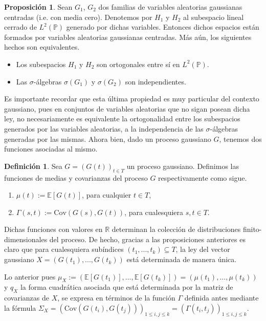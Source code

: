 \documentclass[letterpaper,twoside,12pt]{book}
\newcommand{\R}{\mathbb{R}}
\newcommand{\E}{\mathbb{E}}
\renewcommand{\P}{\mathbb{P}}
\newcommand{\1}{\mathds{1}}
\theoremstyle{definition}
\newtheorem{dfn}{Definición}
\theoremstyle{definition}
\theoremstyle{remark}
\theoremstyle{definition}
\theoremstyle{definition}
\newtheorem{prop}{Proposición}
\theoremstyle{definition}
\theoremstyle{definition}
\theoremstyle{definition}
\begin{document}
\begin{prop}\label{Gaussi_indep} 
 Sean $G_1$, $G_2$ dos familias de variables aleatorias gaussianas centradas (i.e. con media cero). Denotemos por $H_1$ y $H_2$ al subespacio lineal cerrado de $L^{2}(\P)$ generado por dichas variables. Entonces dichos espacios están formados por variables aleatorias gaussianas centradas. Más aún, los siguientes hechos son equivalentes.
 \begin{itemize}
    \item Los subespacios $H_1$ y $H_2$ son ortogonales entre sí en $L^{2}(\P)$.
    \item Las $\sigma$-álgebras $\sigma(G_1)$ y $\sigma(G_2)$ son independientes.
 \end{itemize}
 \end{prop}
 Es importante recordar que esta última propiedad es muy particular del contexto gaussiano, pues en conjuntos de variables aleatorias que no sigan posean dicha ley, no necesariamente es equivalente la ortogonalidad entre los subespacios generados por las variables aleatorias, a la independencia de las $\sigma$-álgebras generadas por las mismas. Ahora bien, dado un proceso gaussiano $G$, tenemos dos funciones asociadas al mismo.
\begin{dfn} 
 Sea $G=(G(t))_{t\in T}$ un proceso gaussiano. Definimos las funciones de medias y covarianzas del proceso $G$ respectivamente como sigue.
 \begin{enumerate}
    \item $\mu(t):=\E\left[G(t)\right]$, \qquad para cualquier $t\in T$,
    \item $\Gamma(s,t):= \text{Cov}\left(G(s),G(t)\right)$, \qquad para cualesquiera $s,t\in T$.
 \end{enumerate}
 \end{dfn}
Dichas funciones con valores en $\R$ determinan la colección de distribuciones finito-dimensionales del proceso. 
De hecho, gracias a las proposiciones anteriores es claro que para cualesquiera subíndices $(t_1,...,t_k)\subseteq T$, la ley del vector gaussiano $X=(G(t_1),...,G(t_k))$ está determinada de manera única. 

Lo anterior pues $\mu_X:=(\E\left[G(t_1)\right],...,\E\left[G(t_k)\right])=(\mu(t_1),...,\mu(t_k))$ y $q_X$ la forma cuadrática asociada que está determinada por la matriz de covarianzas de $X$, se expresa en términos de la función $\Gamma$ definida antes mediante la fórmula $\Sigma_X=\left(\text{Cov}\left(G(t_i),G(t_j)\right)\right)_{1\leq i,j\le k}=\left(\Gamma(t_i,t_j)\right)_{1\le i,j\le k }$.
\end{document}
